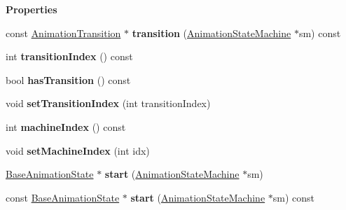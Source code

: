 \begin{Indent}\textbf{ Properties}\par
\begin{DoxyCompactItemize}
\item 
\mbox{\label{classrev_1_1_state_connection_a9af84257cfeaa775feaa75014a0eee0a}} 
const \mbox{\hyperlink{classrev_1_1_animation_transition}{Animation\+Transition}} $\ast$ {\bfseries transition} (\mbox{\hyperlink{classrev_1_1_animation_state_machine}{Animation\+State\+Machine}} $\ast$sm) const
\item 
\mbox{\label{classrev_1_1_state_connection_ad625fc848326caec0a029146d9091a8a}} 
int {\bfseries transition\+Index} () const
\item 
\mbox{\label{classrev_1_1_state_connection_ac9d6ed46d286ca24bda5d24e4863e3ff}} 
bool {\bfseries has\+Transition} () const
\item 
\mbox{\label{classrev_1_1_state_connection_ab1600296c8b76655aacff20645aea67e}} 
void {\bfseries set\+Transition\+Index} (int transition\+Index)
\item 
\mbox{\label{classrev_1_1_state_connection_af9a8f83fdbd13e846fcceb64a75ae43e}} 
int {\bfseries machine\+Index} () const
\item 
\mbox{\label{classrev_1_1_state_connection_a4cb47bf9adaaad020399b09f2a67e5f2}} 
void {\bfseries set\+Machine\+Index} (int idx)
\item 
\mbox{\label{classrev_1_1_state_connection_a7716f34b19202da4992c13223c4631aa}} 
\mbox{\hyperlink{classrev_1_1_base_animation_state}{Base\+Animation\+State}} $\ast$ {\bfseries start} (\mbox{\hyperlink{classrev_1_1_animation_state_machine}{Animation\+State\+Machine}} $\ast$sm)
\item 
\mbox{\label{classrev_1_1_state_connection_ab8b94605cd35eab2e6a58ceeeaf78e7e}} 
const \mbox{\hyperlink{classrev_1_1_base_animation_state}{Base\+Animation\+State}} $\ast$ {\bfseries start} (\mbox{\hyperlink{classrev_1_1_animation_state_machine}{Animation\+State\+Machine}} $\ast$sm) const

\end{DoxyCompactItemize}
\end{Indent}
